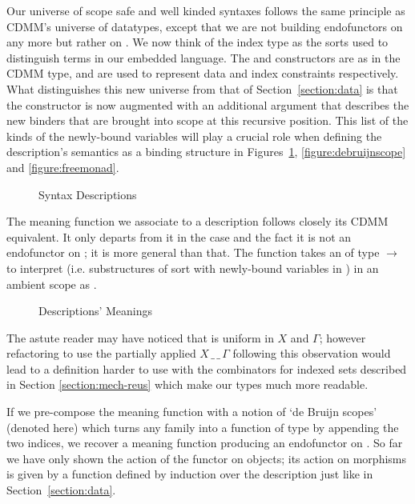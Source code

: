Our universe of scope safe and well kinded syntaxes follows the same principle
as CDMM's universe of datatypes, except that we are not building endofunctors on
 any more but rather on { }. We now think of the index
type  as the sorts
used to distinguish terms in our embedded language. The  and
 constructors are as in the CDMM  type, and are used to
represent data and index constraints respectively.
What distinguishes this new universe  from that of Section~\ref{section:data}
is that the
 constructor
is now augmented with an additional { } argument that describes
the new binders that are brought into scope at this recursive position. This
list of the kinds of the newly-bound variables will play a crucial role when
defining the description's semantics as a binding structure in
Figures~\ref{figure:syntaxmeaning}, \ref{figure:debruijnscope} and \ref{figure:freemonad}.

\begin{figure}[h]
\caption{Syntax Descriptions}
\end{figure}

The meaning function  we associate to a description follows closely
its CDMM equivalent. It only departs from it in the  case and the fact
it is not an endofunctor on  ; it is more general than that.
The function takes an  of type {  $\rightarrow$  }
to interpret {  } (i.e. substructures of sort  with
newly-bound variables in ) in an ambient scope  as {   }.

\begin{figure}[h]
\caption{Descriptions' Meanings}\label{figure:syntaxmeaning}
\end{figure}

The astute reader may have noticed that  is uniform in $X$ and $\Gamma$; however
refactoring  to use the partially applied $X\,\_\,\_\,\Gamma$ following
this observation would lead to a definition harder to use with the
combinators for indexed sets described in Section \ref{section:mech-reus}
which make our types much more readable.

If we pre-compose the meaning function  with a notion of `de Bruijn scopes'
(denoted  here) which turns any   family into a function
of type      by appending the two
 indices, we recover a meaning function producing an endofunctor on
 . So far we have only shown the action of the functor on objects;
its action on morphisms is given by a function  defined by induction over
the description just like in Section~\ref{section:data}.

